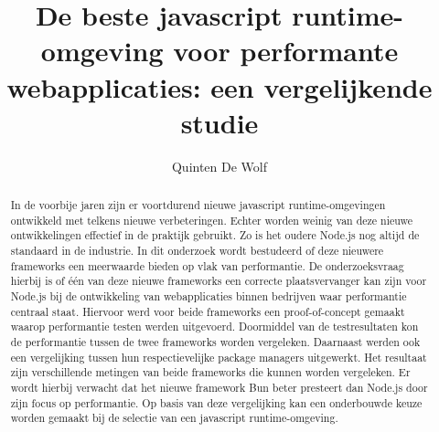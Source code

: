 \documentclass{hogent-article}
\title{De beste javascript runtime-omgeving voor performante webapplicaties: een vergelijkende studie}
\author{Quinten De Wolf}
\begin{document}
\begin{abstract}
  In de voorbije jaren zijn er voortdurend nieuwe javascript runtime-omgevingen ontwikkeld met telkens nieuwe verbeteringen. 
  Echter worden weinig van deze nieuwe ontwikkelingen effectief in de praktijk gebruikt.
  Zo is het oudere Node.js nog altijd de standaard in de industrie. 
  In dit onderzoek wordt bestudeerd of deze nieuwere frameworks een meerwaarde bieden op vlak van performantie.
  De onderzoeksvraag hierbij is of één van deze nieuwe frameworks  
  een correcte plaatsvervanger kan zijn voor Node.js bij de ontwikkeling van webapplicaties binnen bedrijven 
  waar performantie centraal staat.
  Hiervoor werd voor beide frameworks een proof-of-concept gemaakt waarop performantie testen werden uitgevoerd.
  Doormiddel van de testresultaten kon de performantie tussen de twee frameworks worden vergeleken.
  Daarnaast werden ook een vergelijking tussen hun respectievelijke package managers uitgewerkt. 
  Het resultaat zijn verschillende metingen van beide frameworks die kunnen worden vergeleken.
  Er wordt hierbij verwacht dat het nieuwe framework Bun beter presteert dan Node.js door zijn focus op performantie.
  Op basis van deze vergelijking kan een onderbouwde keuze worden gemaakt bij de selectie van een javascript runtime-omgeving.

\end{abstract}

\tableofcontents



\printbibliography[heading=bibintoc]
\end{document}
